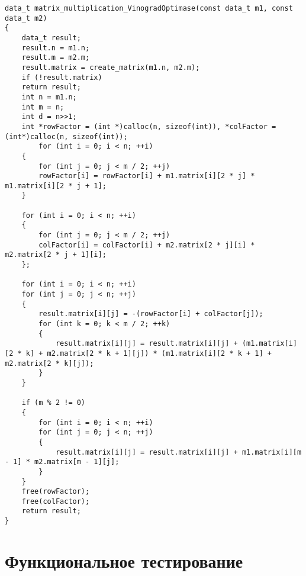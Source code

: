 \begin{center}
\begin{lstlisting}[label=vino_o,caption = {Оптимизированный алгоритм Винограда умножения матриц}]
data_t matrix_multiplication_VinogradOptimase(const data_t m1, const data_t m2)
{
	data_t result;
	result.n = m1.n;
	result.m = m2.m;
	result.matrix = create_matrix(m1.n, m2.m);
	if (!result.matrix)
	return result;
	int n = m1.n;
	int m = n;
	int d = n>>1;
	int *rowFactor = (int *)calloc(n, sizeof(int)), *colFactor = (int*)calloc(n, sizeof(int));
		for (int i = 0; i < n; ++i)
	{
		for (int j = 0; j < m / 2; ++j)
		rowFactor[i] = rowFactor[i] + m1.matrix[i][2 * j] * m1.matrix[i][2 * j + 1];
	}
	
	for (int i = 0; i < n; ++i)
	{
		for (int j = 0; j < m / 2; ++j)
		colFactor[i] = colFactor[i] + m2.matrix[2 * j][i] * m2.matrix[2 * j + 1][i];
	};
	
	for (int i = 0; i < n; ++i)
	for (int j = 0; j < n; ++j)
	{
		result.matrix[i][j] = -(rowFactor[i] + colFactor[j]);
		for (int k = 0; k < m / 2; ++k)
		{
			result.matrix[i][j] = result.matrix[i][j] + (m1.matrix[i][2 * k] + m2.matrix[2 * k + 1][j]) * (m1.matrix[i][2 * k + 1] + m2.matrix[2 * k][j]);
		}
	}
	
	if (m % 2 != 0)
	{
		for (int i = 0; i < n; ++i)
		for (int j = 0; j < n; ++j)
		{
			result.matrix[i][j] = result.matrix[i][j] + m1.matrix[i][m - 1] * m2.matrix[m - 1][j];
		}
	}
	free(rowFactor);
	free(colFactor);
	return result;
}
\end{lstlisting}

\end{center}
\newpage
\section{Функциональное тестирование}

